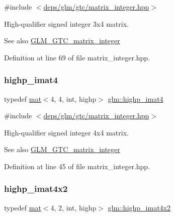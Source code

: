 {\ttfamily \#include $<$\hyperlink{matrix__integer_8hpp}{deps/glm/gtc/matrix\+\_\+integer.\+hpp}$>$}

High-\/qualifier signed integer 3x4 matrix. \begin{DoxySeeAlso}{See also}
\hyperlink{group__gtc__matrix__integer}{G\+L\+M\+\_\+\+G\+T\+C\+\_\+matrix\+\_\+integer} 
\end{DoxySeeAlso}


Definition at line 69 of file matrix\+\_\+integer.\+hpp.

\mbox{\label{group__gtc__matrix__integer_ga2f3fec7874f434d081a186d11ccbed3c}} 
\subsubsection{\texorpdfstring{highp\+\_\+imat4}{highp\_imat4}}
{\footnotesize\ttfamily typedef \hyperlink{structglm_1_1mat}{mat}$<$4, 4, int, highp$>$ \hyperlink{group__gtc__matrix__integer_ga2f3fec7874f434d081a186d11ccbed3c}{glm\+::highp\+\_\+imat4}}



{\ttfamily \#include $<$\hyperlink{matrix__integer_8hpp}{deps/glm/gtc/matrix\+\_\+integer.\+hpp}$>$}

High-\/qualifier signed integer 4x4 matrix. \begin{DoxySeeAlso}{See also}
\hyperlink{group__gtc__matrix__integer}{G\+L\+M\+\_\+\+G\+T\+C\+\_\+matrix\+\_\+integer} 
\end{DoxySeeAlso}


Definition at line 45 of file matrix\+\_\+integer.\+hpp.

\mbox{\label{group__gtc__matrix__integer_gac3bc64ec9129474635c6973f79c149a7}} 
\subsubsection{\texorpdfstring{highp\+\_\+imat4x2}{highp\_imat4x2}}
{\footnotesize\ttfamily typedef \hyperlink{structglm_1_1mat}{mat}$<$4, 2, int, highp$>$ \hyperlink{group__gtc__matrix__integer_gac3bc64ec9129474635c6973f79c149a7}{glm\+::highp\+\_\+imat4x2}}



